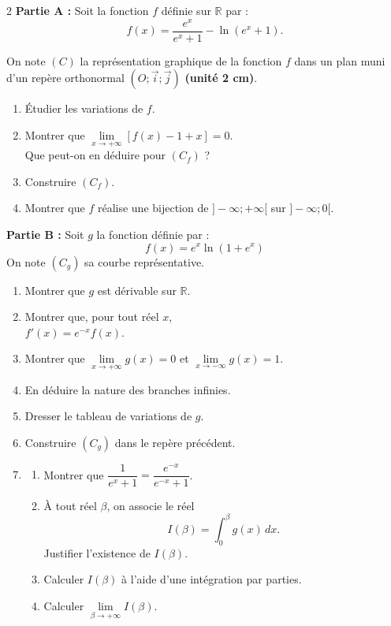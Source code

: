 \documentclass[12pt,a4paper]{article}
\begin{document}
\begin{multicols}{2}
\textbf{Partie A :} Soit la fonction \( f \) définie sur \( \mathbb{R} \) par :
\[
f(x) = \frac{e^x}{e^x + 1} - \ln(e^x + 1).
\]

On note \( (C) \) la représentation graphique de la fonction \( f \) dans un plan muni d’un repère orthonormal \( (O ; \vec{i} ; \vec{j}) \) \textbf{(unité 2 cm)}.

\begin{enumerate}
    \item Étudier les variations de \( f \).
    \item Montrer que \( \lim\limits_{x \to +\infty} \left[ f(x) - 1 + x \right] = 0 \).\\
    Que peut-on en déduire pour \( (C_f) \) ?
    \item Construire \( (C_f) \).
    \item Montrer que \( f \) réalise une bijection de \( ]-\infty ; +\infty[ \) sur \( ]-\infty ; 0[ \).
\end{enumerate}
\textbf{Partie B :} Soit \( g \) la fonction définie par :
\[
f(x) = e^x \ln(1 + e^x)
\]
On note \( (C_g) \) sa courbe représentative.

\begin{enumerate}
    \item Montrer que \( g \) est dérivable sur \( \mathbb{R} \).

    \item Montrer que, pour tout réel \( x \),\\
    \( f'(x) = e^{-x} f(x) \).

    \item Montrer que \( \lim\limits_{x \to +\infty} g(x) = 0 \) et \( \lim\limits_{x \to -\infty} g(x) = 1 \).

    \item En déduire la nature des branches infinies.

    \item Dresser le tableau de variations de \( g \).

    \item Construire \( (C_g) \) dans le repère précédent.
    
    \setcounter{enumi}{6}
    \item 
    \begin{enumerate}
        \item Montrer que \( \dfrac{1}{e^x + 1} = \dfrac{e^{-x}}{e^{-x} + 1} \).
        \item À tout réel \( \beta \), on associe le réel
        \[
        I(\beta) = \int_0^{\beta} g(x)\,dx.
        \]
        Justifier l’existence de \( I(\beta) \).
        \item Calculer \( I(\beta) \) à l’aide d’une intégration par parties.
        \item Calculer \( \lim\limits_{\beta \to +\infty} I(\beta) \).
    \end{enumerate}


\end{enumerate}
\end{multicols}
\end{document}
